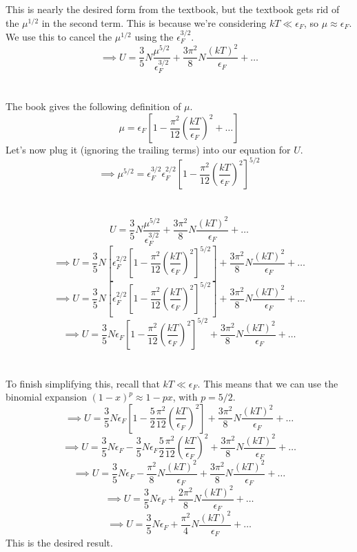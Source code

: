 \documentclass[12pt]{article}
\begin{document}
\begin{flushleft}
This is nearly the desired form from the textbook, but the textbook gets rid of the $\mu^{1/2}$ in the second term.
This is because we're considering $kT\ll\epsilon_F$, so $\mu\approx\epsilon_F$.
We use this to cancel the $\mu^{1/2}$ using the $\epsilon_F^{3/2}$.
$$\implies U=\frac{3}{5}N\frac{\mu^{5/2}}{\epsilon_F^{3/2}}+\frac{3\pi^2}{8}N\frac{(kT)^2}{\epsilon_F}+\dots$$\\~\\

The book gives the following definition of $\mu$.
$$\mu=\epsilon_F\left[1-\frac{\pi^2}{12}\left(\frac{kT}{\epsilon_F}\right)^2+\dots\right]$$
Let's now plug it (ignoring the trailing terms) into our equation for $U$.
$$\implies\mu^{5/2}=\epsilon_F^{3/2}\epsilon_F^{2/2}\left[1-\frac{\pi^2}{12}\left(\frac{kT}{\epsilon_F}\right)^2\right]^{5/2}$$\\~\\

$$U=\frac{3}{5}N\frac{\mu^{5/2}}{\epsilon_F^{3/2}}+\frac{3\pi^2}{8}N\frac{(kT)^2}{\epsilon_F}+\dots$$
$$\implies U=\frac{3}{5}N\left[\epsilon_F^{2/2}\left[1-\frac{\pi^2}{12}\left(\frac{kT}{\epsilon_F}\right)^2\right]^{5/2}\right]+\frac{3\pi^2}{8}N\frac{(kT)^2}{\epsilon_F}+\dots$$
$$\implies U=\frac{3}{5}N\left[\epsilon_F^{2/2}\left[1-\frac{\pi^2}{12}\left(\frac{kT}{\epsilon_F}\right)^2\right]^{5/2}\right]+\frac{3\pi^2}{8}N\frac{(kT)^2}{\epsilon_F}+\dots$$
$$\implies U=\frac{3}{5}N\epsilon_F\left[1-\frac{\pi^2}{12}\left(\frac{kT}{\epsilon_F}\right)^2\right]^{5/2}+\frac{3\pi^2}{8}N\frac{(kT)^2}{\epsilon_F}+\dots$$\\~\\

To finish simplifying this, recall that $kT\ll\epsilon_F$.
This means that we can use the binomial expansion $(1-x)^p\approx1-px$, with $p=5/2$.
$$\implies U=\frac{3}{5}N\epsilon_F\left[1-\frac{5}{2}\frac{\pi^2}{12}\left(\frac{kT}{\epsilon_F}\right)^2\right]+\frac{3\pi^2}{8}N\frac{(kT)^2}{\epsilon_F}+\dots$$
$$\implies U=\frac{3}{5}N\epsilon_F-\frac{3}{5}N\epsilon_F\frac{5}{2}\frac{\pi^2}{12}\left(\frac{kT}{\epsilon_F}\right)^2+\frac{3\pi^2}{8}N\frac{(kT)^2}{\epsilon_F}+\dots$$
$$\implies U=\frac{3}{5}N\epsilon_F-\frac{\pi^2}{8}N\frac{(kT)^2}{\epsilon_F}+\frac{3\pi^2}{8}N\frac{(kT)^2}{\epsilon_F}+\dots$$
$$\implies U=\frac{3}{5}N\epsilon_F+\frac{2\pi^2}{8}N\frac{(kT)^2}{\epsilon_F}+\dots$$
$$\implies U=\frac{3}{5}N\epsilon_F+\frac{\pi^2}{4}N\frac{(kT)^2}{\epsilon_F}+\dots$$
This is the desired result.




\end{flushleft}
\end{document}

